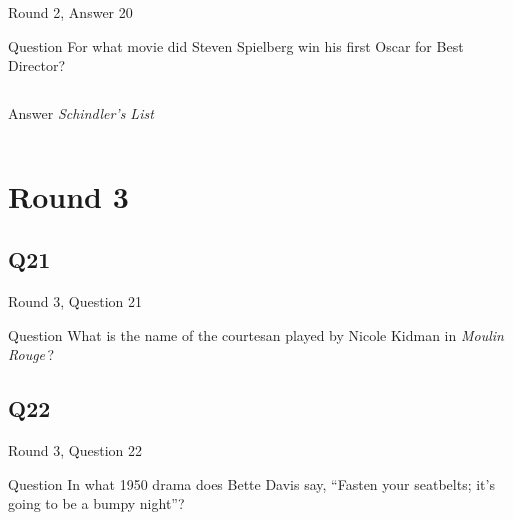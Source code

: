 \documentclass[11pt]{beamer}
\begin{document}
\begin{frame}[t]{Round 2, Answer 20}
\vspace{2em}
\begin{block}{Question}
For what movie did Steven Spielberg win his first Oscar for Best Director?
\end{block}
\pause{}
\begin{columns}[T,totalwidth=\linewidth]
\begin{column}{0.35\linewidth}
\begin{block}{Answer}
\emph{Schindler's List}
\end{block}
\end{column}
\begin{column}{0.6\linewidth}
\begin{center}
\texttt{[image: \{Images/schindler]}.jpg}
\end{center}
\end{column}
\end{columns}
\end{frame}
    

\section{Round 3}
    

\subsection*{Q21}
\begin{frame}[t]{Round 3, Question 21}
\vspace{2em}
\begin{block}{Question}
What is the name of the courtesan played by Nicole Kidman in \emph{Moulin Rouge}\,?
\end{block}
\end{frame}
    

\subsection*{Q22}
\begin{frame}[t]{Round 3, Question 22}
\vspace{2em}
\begin{block}{Question}
In what 1950 drama does Bette Davis say, ``Fasten your seatbelts; it's going to be a bumpy night''?
\end{block}
\end{frame}
    
\end{document}
